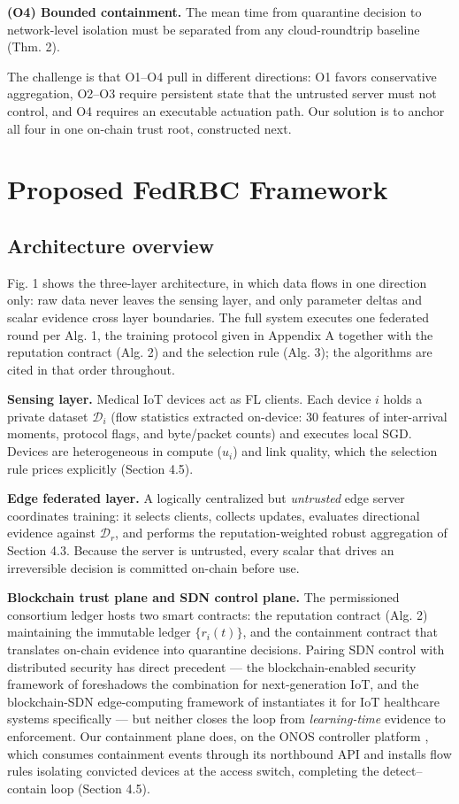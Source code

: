 \documentclass[cmc,article,submit,moreauthors,pdftex]{Definitions/tsp}
\begin{document}
\textbf{(O4) Bounded containment.} The mean time from quarantine decision to network-level isolation must be separated from any cloud-roundtrip baseline (Thm. 2).

The challenge is that O1--O4 pull in different directions: O1 favors conservative aggregation, O2--O3 require persistent state that the untrusted server must not control, and O4 requires an executable actuation path. Our solution is to anchor all four in one on-chain trust root, constructed next.

\section{Proposed FedRBC Framework}\label{sec:proposed-fedrbc-framework}

\subsection{Architecture overview}\label{sec:architecture-overview}

Fig. 1 shows the three-layer architecture, in which data flows in one direction only: raw data never leaves the sensing layer, and only parameter deltas and scalar evidence cross layer boundaries. The full system executes one federated round per Alg. 1, the training protocol given in Appendix A together with the reputation contract (Alg. 2) and the selection rule (Alg. 3); the algorithms are cited in that order throughout.

\textbf{Sensing layer.} Medical IoT devices act as FL clients. Each device $i$ holds a private dataset $\mathcal{D}_i$ (flow statistics extracted on-device: 30 features of inter-arrival moments, protocol flags, and byte/packet counts) and executes local SGD. Devices are heterogeneous in compute ($u_i$) and link quality, which the selection rule prices explicitly (Section 4.5).

\textbf{Edge federated layer.} A logically centralized but \emph{untrusted} edge server coordinates training: it selects clients, collects updates, evaluates directional evidence against $\mathcal{D}_r$, and performs the reputation-weighted robust aggregation of Section 4.3. Because the server is untrusted, every scalar that drives an irreversible decision is committed on-chain before use.

\textbf{Blockchain trust plane and SDN control plane.} The permissioned consortium ledger hosts two smart contracts: the reputation contract (Alg. 2) maintaining the immutable ledger $\{r_i(t)\}$, and the containment contract that translates on-chain evidence into quarantine decisions. Pairing SDN control with distributed security has direct precedent --- the blockchain-enabled security framework of \cite{ref-11} foreshadows the combination for next-generation IoT, and the blockchain-SDN edge-computing framework of \cite{ref-53} instantiates it for IoT healthcare systems specifically --- but neither closes the loop from \emph{learning-time} evidence to enforcement. Our containment plane does, on the ONOS controller platform \cite{ref-54}, which consumes containment events through its northbound API and installs flow rules isolating convicted devices at the access switch, completing the detect--contain loop (Section 4.5).
\end{document}

